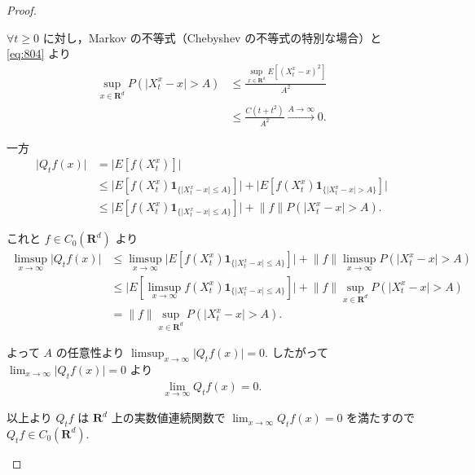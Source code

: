 \documentclass{jsarticle}
\begin{document}
\begin{proof}
\begin{enumerate}[label=(\arabic*)]
\begin{enumerate}[label=(\roman*)]
            $\forall t\ge0$ に対し，Markov の不等式（Chebyshev の不等式の特別な場合）と \eqref{eq:804} より
            \begin{align}
                \sup_{x\in\mathbf{R}^d}P(\lvert X_{t}^{x}-x\rvert>A)
                &\le \frac{\sup_{x\in\mathbf{R}^d}E[(X_{t}^{x}-x)^2]}{A^2} \\
                &\le \frac{C(t+t^2)}{A^2}\xrightarrow{A\to\infty}0.
            \end{align}

            一方
            \begin{align}
                \lvert Q_{t}f(x)\rvert
                &= \lvert E[f(X_{t}^{x})]\rvert \\
                &\le \lvert E[f(X_{t}^{x})\bm{1}_{\{\lvert X_{t}^{x}-x\rvert\le A\}}]\rvert
                + \lvert E[f(X_{t}^{x})\bm{1}_{\{\lvert X_{t}^{x}-x\rvert>A\}}]\rvert \\
                &\le \lvert E[f(X_{t}^{x})\bm{1}_{\{\lvert X_{t}^{x}-x\rvert\le A\}}]\rvert
                + \lVert f\rVert P(\lvert X_{t}^{x}-x\rvert>A).
            \end{align}

            これと $f\in C_{0}(\mathbf{R}^d)$ より
            \begin{align}
                \limsup_{x\to\infty}\lvert Q_{t}f(x)\rvert
                &\le \limsup_{x\to\infty}\lvert E[f(X_{t}^{x})\bm{1}_{\{\lvert X_{t}^{x}-x\rvert\le A\}}]\rvert
                + \lVert f\rVert \limsup_{x\to\infty}P(\lvert X_{t}^{x}-x\rvert>A) \\
                &\le \lvert E[\limsup_{x\to\infty}f(X_{t}^{x})\bm{1}_{\{\lvert X_{t}^{x}-x\rvert\le A\}}]\rvert
                + \lVert f\rVert \sup_{x\in\mathbf{R}^d}P(\lvert X_{t}^{x}-x\rvert>A) \\
                &= \lVert f\rVert \sup_{x\in\mathbf{R}^d}P(\lvert X_{t}^{x}-x\rvert>A).
            \end{align}

            よって $A$ の任意性より $\limsup_{x\to\infty}\lvert Q_{t}f(x)\rvert=0.$
            したがって $\lim_{x\to\infty}\lvert Q_{t}f(x)\rvert=0$ より 
            \begin{align}
                \lim_{x\to\infty}Q_{t}f(x)=0.
            \end{align}
            
            以上より $Q_{t}f$ は $\mathbf{R}^d$ 上の実数値連続関数で $\lim_{x\to\infty}Q_{t}f(x)=0$ を満たすので $Q_{t}f\in C_{0}(\mathbf{R}^d).$
                

\end{enumerate}
\end{enumerate}
\end{proof}
\end{document}
